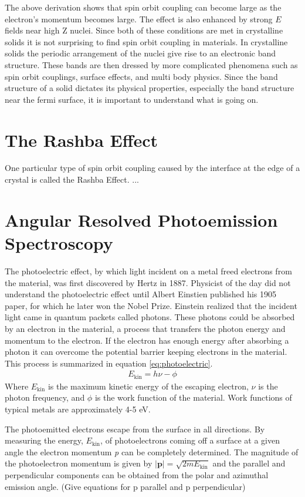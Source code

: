\documentclass[12pt]{article}
\begin{document}
The above derivation shows that spin orbit coupling can become large as the electron's momentum becomes large.
The effect is also enhanced by strong $E$ fields near high Z nuclei.
Since both of these conditions are met in crystalline solids it is not surprising to find spin orbit coupling in materials.
In crystalline solids the periodic arrangement of the nuclei give rise to an electronic band structure.
These bands are then dressed by more complicated phenomena such as spin orbit couplings, surface effects, and multi body physics.
Since the band structure of a solid dictates its physical properties, especially the band structure near the fermi surface, it is important to understand what is going on.

\section{The Rashba Effect}
One particular type of spin orbit coupling caused by the interface at the edge of a crystal is called the Rashba Effect.
...
\section{Angular Resolved Photoemission Spectroscopy}
The photoelectric effect, by which light incident on a metal freed electrons from the material, was first discovered by Hertz in 1887.
Physicist of the day did not understand the photoelectric effect until Albert Einstien published his 1905 paper, for which he later won the Nobel Prize.
Einstein realized that the incident light came in quantum packets called photons.
These photons could be absorbed by an electron in the material, a process that transfers the photon energy and momentum to the electron.
If the electron has enough energy after absorbing a photon it can overcome the potential barrier keeping electrons in the material.
This process is summarized in equation \ref{eq:photoelectric}.
\begin{align}
  \label{eq:photoelectric}
  E_{\text{kin}}=h\nu-\phi
\end{align}
Where $E_{\text{kin}}$ is the maximum kinetic energy of the escaping electron, $\nu$ is the photon frequency, and $\phi$ is the work function of the material.
Work functions of typical metals are approximately 4-5 eV.

The photoemitted electrons escape from the surface in all directions.
By measuring the energy, $E_{\text{kin}}$, of photoelectrons coming off a surface at a given angle the electron momentum \emph{p} can be completely determined.
The magnitude of the photoelectron momentum is given by $|\boldsymbol{p}|=\sqrt{2mE_{\text{kin}}}$ and the parallel and perpendicular components can be obtained from the polar and azimuthal emission angle.
(Give equations for p parallel and p perpendicular)
\end{document}
